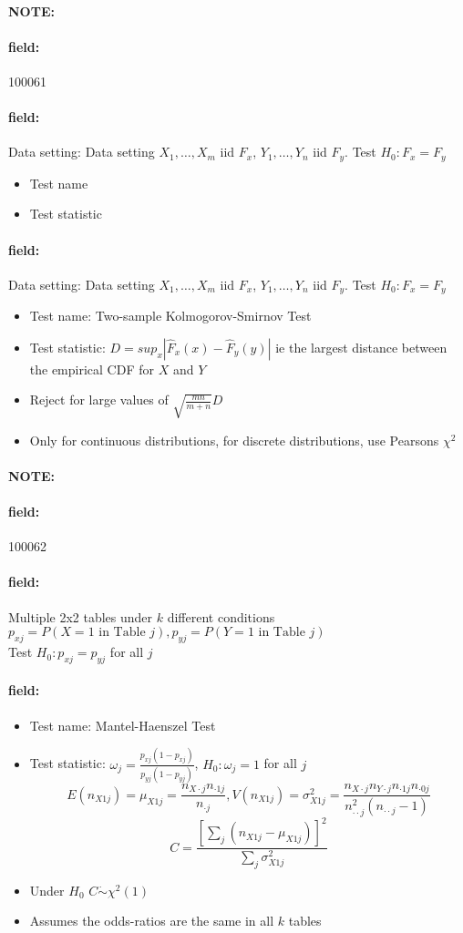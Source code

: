 \documentclass[12pt]{article}
\newenvironment{note}{\paragraph{NOTE:}}{}
\newenvironment{field}{\paragraph{field:}}{}
\begin{document}
\begin{note} \begin{field} \tiny 100061 \end{field}
 \begin{field}
  Data setting: Data setting $X_1, \ldots , X_m$ iid $F_x$, $Y_1, \ldots, Y_n$ iid $F_y$. Test $H_0: F_x = F_y$
  \begin{itemize}
   \item Test name
   \item Test statistic

  \end{itemize}
 \end{field}
 \begin{field}
  Data setting: Data setting $X_1, \ldots , X_m$ iid $F_x$, $Y_1, \ldots, Y_n$ iid $F_y$. Test $H_0: F_x = F_y$
  \begin{itemize}
   \item Test name: Two-sample Kolmogorov-Smirnov Test
   \item Test statistic: $D = sup_x|\hat{F}_x(x) - \hat{F}_y(y)|$ ie the largest distance between the empirical CDF for $X$ and $Y$
   \item Reject for large values of $\sqrt{\frac{mn}{m+n}} D$
   \item Only for continuous distributions, for discrete distributions, use Pearsons $\chi^2$
  \end{itemize}
 \end{field}
\end{note}

\begin{note} \begin{field} \tiny 100062 \end{field}
 \begin{field}
  Multiple 2x2 tables under $k$ different conditions\\ $p_{xj} = P(X = 1 \text{ in Table }j), p_{yj} = P(Y = 1 \text{ in Table }j)$\\
  Test $H_0: p_{xj} = p_{yj}$ for all $j$
 \end{field}

 \begin{field}
  \begin{itemize}
   \item Test name: Mantel-Haenszel Test
   \item Test statistic: $\omega_j = \frac{p_{xj}(1 - p_{xj})}{p_{yj}(1 - p_{yj})}$, $H_0: \omega_j = 1$ for all $j$
         $$E(n_{X1j}) = \mu_{X1j} = \frac{n_{X\cdot j}n_{\cdot 1 j}}{n_{\cdot j}}, V(n_{X1j}) = \sigma^2_{X1j} = \frac{n_{X\cdot j}n_{Y\cdot j}n_{\cdot 1j} n_{\cdot 0j}}{n^2_{\cdot \cdot j}(n_{\cdot \cdot j} -1)} $$
         $$ C = \frac{[\sum_{j}(n_{X1j} - \mu_{X1j})]^2}{\sum_j \sigma^2_{X1j}}$$
   \item Under $H_0$ $C \dot\sim \chi^2(1)$
   \item Assumes the odds-ratios are the same in all $k$ tables
  \end{itemize}
 \end{field}
\end{note}
\end{document}
